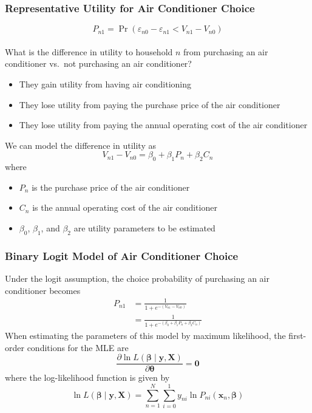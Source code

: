 \documentclass{beamer}\usepackage[]{graphicx}\usepackage[]{xcolor}
\begin{document}
\begin{frame}\frametitle{Representative Utility for Air Conditioner Choice}
    \vspace{-2ex}
    $$P_{n1} = \Pr(\varepsilon_{n0} - \varepsilon_{n1} < V_{n1} - V_{n0})$$ \\
    \vspace{1ex}
    What is the difference in utility to household $n$ from purchasing an air conditioner vs.\ not purchasing an air conditioner?
    \begin{itemize}
        \item They gain utility from having air conditioning
        \item They lose utility from paying the purchase price of the air conditioner
        \item They lose utility from paying the annual operating cost of the air conditioner
    \end{itemize}
    \vspace{2ex}
    We can model the difference in utility as
    $$V_{n1} - V_{n0} = \beta_0 + \beta_1 P_n + \beta_2 C_n$$
    where
    \begin{itemize}
        \item $P_n$ is the purchase price of the air conditioner
        \item $C_n$ is the annual operating cost of the air conditioner
        \item $\beta_0$, $\beta_1$, and $\beta_2$ are utility parameters to be estimated
    \end{itemize}
\end{frame}

\begin{frame}\frametitle{Binary Logit Model of Air Conditioner Choice}
    Under the logit assumption, the choice probability of purchasing an air conditioner becomes
    \begin{align*}
        P_{n1} & = \frac{1}{1 + e^{-(V_{n1} - V_{n0})}} \\
        & = \frac{1}{1 + e^{-(\beta_0 + \beta_1 P_n + \beta_2 C_n)}}
    \end{align*}
    When estimating the parameters of this model by maximum likelihood, the first-order conditions for the MLE are
    $$\frac{\partial \ln L(\bm{\beta} \mid \bm{y}, \bm{X})}{\partial \bm{\theta}} = \bm{0}$$
    where the log-likelihood function is given by
    $$\ln L(\bm{\beta} \mid \bm{y}, \bm{X}) = \sum_{n = 1}^N \sum_{i = 0}^1 y_{ni} \ln P_{ni}(\bm{x}_n, \bm{\beta})$$
\end{frame}
\end{document}
